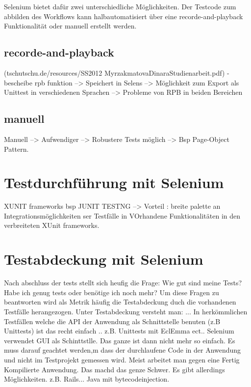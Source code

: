 Selenium bietet dafür zwei unterschiedliche Möglichkeiten. Der Testcode zum abbilden des Workflows kann halbautomatisiert über eine recorde-and-playback Funktionalität oder manuell erstellt werden.

\subsection{recorde-and-playback}
\label{sec:recorde_and_playback}
(tschutschu.de/resources/SS2012 MyrzakmatovaDinaraStudienarbeit.pdf)
-bescheibe rpb funktion --> Speichert in Selens  --> Möglichkeit zum Export als Unittest in verschiedenen Sprachen --> Probleme von RPB in beiden Bereichen

\subsection{manuell}
\label{sec:manuell}
Manuell --> Aufwendiger --> Robustere Tests möglich --> Bsp Page-Object Pattern.

\section{Testdurchführung mit Selenium}
\label{sec:testdurchführung_mit_selenium}

XUNIT frameworks bsp JUNIT TESTNG --> Vorteil : breite palette an Integrationsmöglichkeiten ser Testfälle in VOrhandene Funktionalitäten in den verbreiteten XUnit frameworks.

\section{Testabdeckung mit Selenium}
\label{sec:testdurchführung_mit_selenium}

Nach abschluss der tests stellt sich heufig die Frage: Wie gut sind meine Tests? Habe ich genug tests oder benötige ich noch mehr? Um diese Fragen zu beantworten wird als Metrik häufig die Testabdeckung duch die vorhandenen Testfälle herangezogen. Unter Testabdeckung versteht man: ...
In herkömmlichen Testfällen welche die API der Anwendung als Schnittstelle benuten (z.B Unittests) ist das recht einfach .. z.B. Unittests mit EclEmma ect.. Selenium verwendet GUI als Schinttstlle. Das ganze ist dann nicht mehr so einfach. Es muss darauf geachtet werden,m dass der durchlaufene Code in der Anwendung und nicht im Testprojekt gemessen wird. Meist arbeitet man gegen eine Fertig Kompilierte Anwendung. Das machd das genze Schwer. Es gibt allerdings Möglichkeiten. z.B. Rails... Java mit bytecodeinjection.